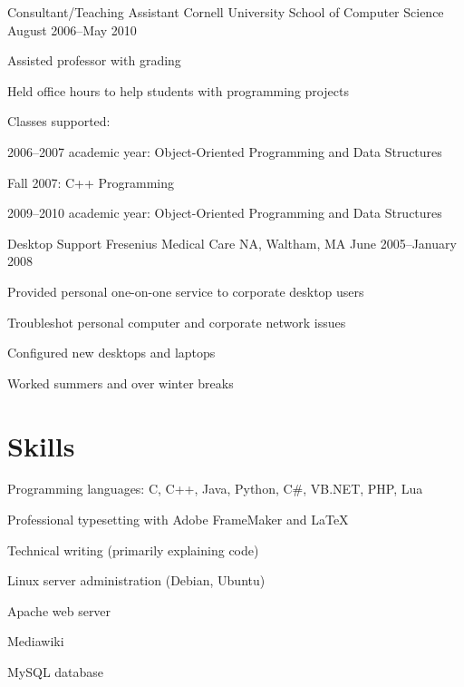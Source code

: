 \documentclass{res}
\begin{document}
\begin{resume}
\affiliation
	{Consultant/Teaching Assistant}
	{Cornell University School of Computer Science}
	{August 2006--May 2010}
	\begin{pos}
	\item Assisted professor with grading
	\item Held office hours to help students with programming
	projects
	\item Classes supported:
		\begin{compactitem}
		\item 2006--2007 academic year: Object-Oriented Programming and Data
		Structures
		\item Fall 2007: C++ Programming
		\item 2009--2010 academic year: Object-Oriented Programming and Data
		Structures
		\end{compactitem}
	\end{pos}

\affiliation
	{Desktop Support}
	{Fresenius Medical Care NA, Waltham, MA}
	{June 2005--January 2008}
	\begin{pos}
	\item Provided personal one-on-one service to corporate desktop users
	\item Troubleshot personal computer and corporate network issues
	\item Configured new desktops and laptops
	\item Worked summers and over winter breaks
	\end{pos}

\section{Skills}
	\vspace{10pt}
	\begin{compactitem}
	\item Programming languages: C, C++, Java, Python, C\#, VB.NET, PHP, Lua
	\item Professional typesetting with Adobe FrameMaker and \LaTeX{}
	\item Technical writing (primarily explaining code)
	\item Linux server administration (Debian, Ubuntu)
		\begin{compactitem}
		\item Apache web server
		\item Mediawiki
		\item MySQL database
		\end{compactitem}
	\end{compactitem}

\end{resume}
\end{document}
